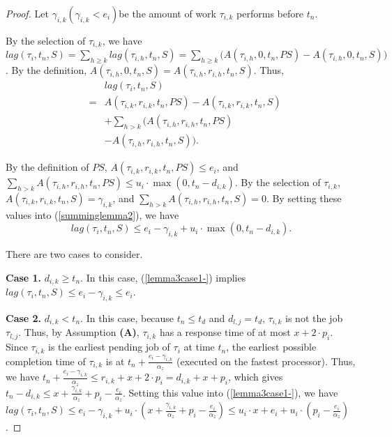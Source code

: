 \documentclass[Times, 10pt,twocolumn]{article}
\theoremstyle{definition}
\begin{document}
\begin{proof}
Let $\gamma_{i,k}(\gamma_{i,k} < e_i)$be the amount of work $\tau_{i,k}$ performs before $t_{n}$.

By the selection of $\tau_{i,k}$, we have $lag(\tau_i, t_n, {S}) = \sum_{h \geq k} lag(\tau_{i,h}, t_n, {S})  = \sum_{h \geq k} \big(A(\tau_{i,h}, 0, t_n,PS) - A(\tau_{i,h}, 0, t_n, {S})\big)$. By the definition, $A(\tau_{i,h}, 0, t_n, {S}) = A(\tau_{i,h}, r_{i,h}, t_n, {S})$. Thus,
\begin{eqnarray}
\label{summinglemma2}
&& lag(\tau_i, t_n, {S}) \nonumber \\
 &= & A(\tau_{i,k}, r_{i,k}, t_n, PS) - A(\tau_{i,k}, r_{i,k}, t_n, {S}) \nonumber \\
& & + \sum_{h >k} \big(A(\tau_{i,h}, r_{i,h}, t_n, PS) \nonumber \\
& & - A(\tau_{i,h}, r_{i,h}, t_n, {S}) \big).
\end{eqnarray}

By the definition of $PS$, $A(\tau_{i,k}, r_{i,k},t_n, PS) \leq e_i$, and $\sum_{h > k} A(\tau_{i,h}, r_{i,h}, t_n, PS)\leq {u_i} \cdot \max(0,t_n - d_{i,k})$. By the selection of $\tau_{i,k}$, $A(\tau_{i,k}, r_{i,k}, t_n, {S}) = \gamma_{i,k}$, and $\sum_{h > k} A(\tau_{i,h}, r_{i,h}, t_n, {S}) = 0$. By setting these values into (\ref{summinglemma2}), we have
\begin{equation}
\label{lemma3case1-}
lag(\tau_i, t_n, {S}) \leq e_i - \gamma_{i,k} + u_i \cdot \max(0,t_n - d_{i,k}).
\end{equation}

There are two cases to consider.

\vspace{1mm}
\textbf{Case 1.} $d_{i,k} \geq t_n$.
In this case, (\ref{lemma3case1-}) implies $lag(\tau_i, t_n, {S}) \leq e_i - \gamma_{i,k} \leq e_i$.

\vspace{2mm}
\textbf{Case 2.} $d_{i,k} < t_n$. In this case, because $t_n \leq t_d$ and $d_{l,j}=t_d$, $\tau_{i,k}$ is not the job $\tau_{l,j}$. Thus, by Assumption \textbf{(A)}, $\tau_{i,k}$ has a response time of at most $x + 2 \cdot p_i$. Since $\tau_{i,k}$ is the earliest pending job of $\tau_i$ at time $t_n$, the earliest possible completion time of $\tau_{i,k}$ is at $t_n+\frac{e_i-\gamma_{i,k}}{\alpha_{z}}$ (executed on the fastest processor). Thus, we have $t_n+\frac{e_i-\gamma_{i,k}}{\alpha_{z}} \leq r_{i,k}+x+2 \cdot p_i = d_{i,k} +x + p_i $, which gives $t_n - d_{i,k} \leq x + \frac{\gamma_{i,k}}{\alpha_{z}}+p_i-\frac{e_i}{\alpha_{z}}$. Setting this value into (\ref{lemma3case1-}), we have $lag(\tau_i, t_n, {S}) \leq e_i-\gamma_{i,k}+u_i \cdot (x + \frac{\gamma_{i,k}}{\alpha_{z}}+p_i-\frac{e_i}{\alpha_{z}}) \leq u_i \cdot x + e_i+ u_i \cdot (p_i- \frac{e_i}{\alpha_{z}}) $.
\end{proof}
\end{document}
